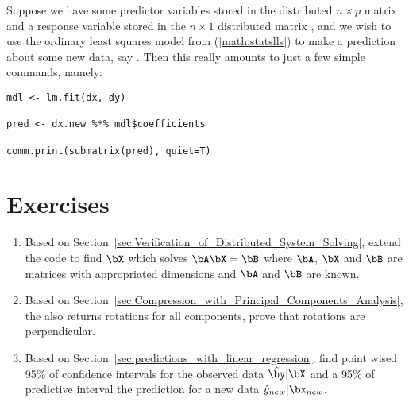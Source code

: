 Suppose we have some predictor variables stored in the distributed
$n\times p$ matrix  and a response variable stored
in the $n\times 1$ distributed matrix , and we wish to use the
ordinary least squares model from (\ref{math:statslls}) to make a
prediction about some new data, say . Then this really
amounts to just a few simple commands, namely:
\begin{lstlisting}[language=rr]
mdl <- lm.fit(dx, dy)

pred <- dx.new %*% mdl$coefficients

comm.print(submatrix(pred), quiet=T)
\end{lstlisting}




\section{Exercises}
\label{sec:pmclust_exercise}

\begin{enumerate}[label=\thechapter-\arabic*]

\item
Based on Section~\ref{sec:Verification_of_Distributed_System_Solving},
extend the code to find $\bX$ which solves $\bA\bX = \bB$
where $\bA$, $\bX$ and $\bB$ are matrices with
appropriated dimensions and $\bA$ and $\bB$ are known.

\item
Based on Section~\ref{sec:Compression_with_Principal_Components_Analysis},
the  also returns rotations for all components,
prove that rotations are perpendicular.

\item
Based on Section~\ref{sec:predictions_with_linear_regression},
find point wised 95\% of confidence intervals for the observed data
$\hat{\by}|\bX$ and a 95\% of predictive interval
the prediction for a new data $\hat{y}_{new}|\bx_{new}$.

\end{enumerate}

